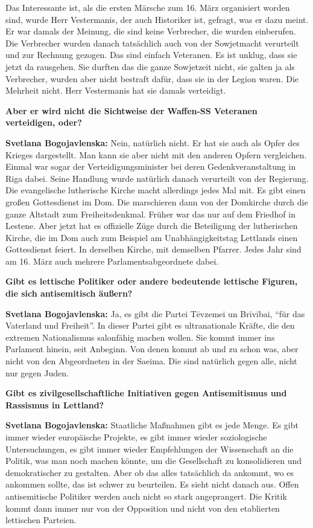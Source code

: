 Das Interessante ist, als die ersten Märsche zum 16. März organisiert worden sind, wurde Herr Vestermanis, der auch Historiker ist, gefragt, was er dazu meint. Er war damals der Meinung, die sind keine Verbrecher, die wurden einberufen. Die Verbrecher wurden danach tatsächlich auch von der Sowjetmacht verurteilt und zur Rechnung gezogen. Das sind einfach Veteranen. Es ist unklug, dass sie jetzt da rausgehen. Sie durften das die ganze Sowjetzeit nicht, sie galten ja als Verbrecher, wurden aber nicht bestraft dafür, dass sie in der Legion waren. Die Mehrheit nicht. Herr Vestermanis hat sie damals verteidigt.

\textbf{Aber er wird nicht die Sichtweise der Waffen-SS Veteranen verteidigen, oder?}

\textbf{Svetlana Bogojavlenska:} Nein, natürlich nicht. Er hat sie auch als Opfer des Krieges dargestellt. Man kann sie aber nicht mit den anderen Opfern vergleichen. Einmal war sogar der Verteidigungsminister bei deren Gedenkveranstaltung in Riga dabei. Seine Handlung wurde natürlich danach verurteilt von der Regierung. Die evangelische lutherische Kirche macht allerdings jedes Mal mit. Es gibt einen großen Gottesdienst im Dom. Die marschieren dann von der Domkirche durch die ganze Altstadt zum Freiheitsdenkmal. Früher war das nur auf dem Friedhof in Lestene. Aber jetzt hat es offizielle Züge durch die Beteiligung der lutherischen Kirche, die im Dom auch zum Beispiel am Unabhängigkeitstag Lettlands einen Gottesdienst feiert. In derselben Kirche, mit demselben Pfarrer. Jedes Jahr sind am 16. März auch mehrere Parlamentsabgeordnete dabei.

\textbf{Gibt es lettische Politiker oder andere bedeutende lettische Figuren, die sich antisemitisch äußern?}

\textbf{Svetlana Bogojavlenska:}  Ja, es gibt die Partei Tēvzemei un Brīvībai, “für das Vaterland und Freiheit”. In dieser Partei gibt es ultranationale Kräfte, die den extremen Nationalismus salonfähig machen wollen. Sie kommt immer ins Parlament hinein, seit Anbeginn. Von denen kommt ab und zu schon was, aber nicht von den Abgeordneten in der Saeima. Die sind natürlich gegen alle, nicht nur gegen Juden.

\textbf{Gibt es zivilgesellschaftliche Initiativen gegen Antisemitismus und Rassismus in Lettland?}

\textbf{Svetlana Bogojavlenska:}  Staatliche Maßnahmen gibt es jede Menge. Es gibt immer wieder europäische Projekte, es gibt immer wieder soziologische Untersuchungen, es gibt immer wieder Empfehlungen der Wissenschaft an die Politik, was man noch machen könnte, um die Gesellschaft zu konsolidieren und demokratischer zu gestalten. Aber ob das alles tatsächlich da ankommt, wo es ankommen sollte, das ist schwer zu beurteilen. Es sieht nicht danach aus. Offen antisemitische Politiker werden auch nicht so stark angeprangert. Die Kritik kommt dann immer nur von der Opposition und nicht von den etablierten lettischen Parteien.


